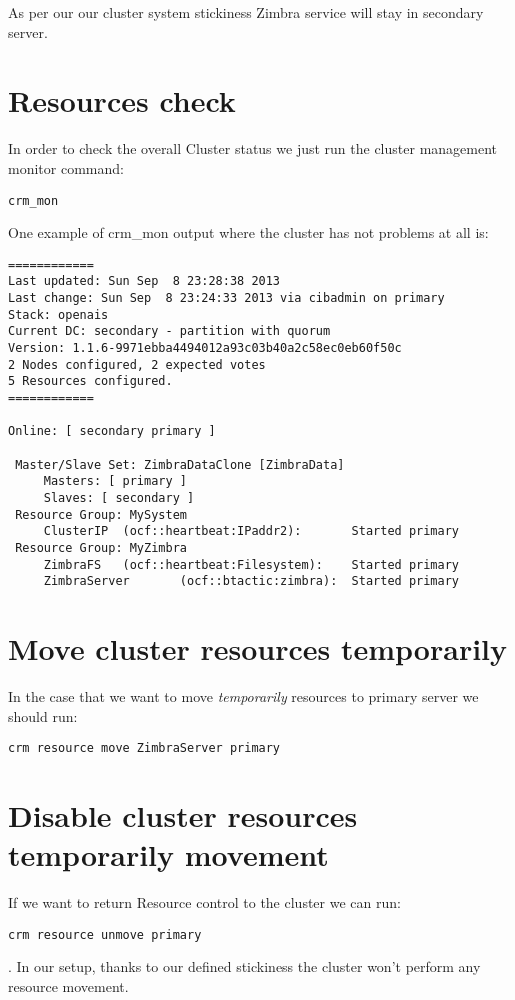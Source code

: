 As per our our cluster system stickiness Zimbra service will stay in secondary server.

\section {Resources check}
In order to check the overall Cluster status we just run the cluster management monitor command:
\begin{verbatim}
crm_mon
\end{verbatim}

One example of crm\_mon output where the cluster has not problems at all is:
\begin{verbatim}
============
Last updated: Sun Sep  8 23:28:38 2013
Last change: Sun Sep  8 23:24:33 2013 via cibadmin on primary
Stack: openais
Current DC: secondary - partition with quorum
Version: 1.1.6-9971ebba4494012a93c03b40a2c58ec0eb60f50c
2 Nodes configured, 2 expected votes
5 Resources configured.
============

Online: [ secondary primary ]

 Master/Slave Set: ZimbraDataClone [ZimbraData]
     Masters: [ primary ]
     Slaves: [ secondary ]
 Resource Group: MySystem
     ClusterIP  (ocf::heartbeat:IPaddr2):       Started primary
 Resource Group: MyZimbra
     ZimbraFS   (ocf::heartbeat:Filesystem):    Started primary
     ZimbraServer       (ocf::btactic:zimbra):  Started primary
\end{verbatim}

\section {Move cluster resources temporarily}
In the case that we want to move \textit{temporarily} resources to primary server we should run:
\begin{verbatim}
crm resource move ZimbraServer primary
\end{verbatim}

\section {Disable cluster resources temporarily movement}
If we want to return Resource control to the cluster we can run:
\begin{verbatim}
crm resource unmove primary
\end{verbatim}
. In our setup, thanks to our defined stickiness the cluster won't perform any resource movement.

